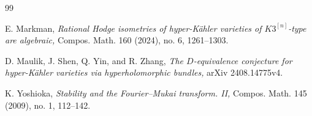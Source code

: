 \documentclass[11pt]{amsart}
\theoremstyle{plain}
\theoremstyle{definition}
\theoremstyle{remark}
\begin{document}
\begin{thebibliography}{99}


 E. Markman, {\em Rational Hodge isometries of hyper-K\"ahler varieties of $K3^{[n]}$-type are algebraic,} Compos. Math. 160 (2024), no. 6, 1261--1303.

 D. Maulik, J. Shen, Q. Yin, and R. Zhang, {\em The $D$-equivalence conjecture for hyper-K\"ahler varieties via hyperholomorphic bundles,} arXiv 2408.14775v4.









 K. Yoshioka, {\em Stability and the Fourier--Mukai transform. II,} Compos. Math. 145 (2009), no. 1, 112--142.

\end{thebibliography}
\end{document}
